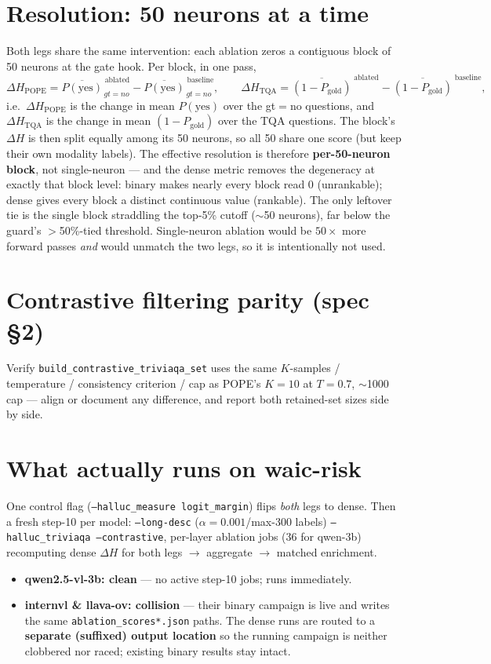 \documentclass[11pt,a4paper]{article}
\newcommand{\code}[1]{\texttt{#1}}
\begin{document}
\section{Resolution: 50 neurons at a time}
Both legs share the same intervention: each ablation zeros a contiguous block of 50
neurons at the gate hook. Per block, in one pass,
\[
\Delta H_{\text{POPE}} = \overline{P(\text{yes})}^{\;\text{ablated}}_{\,gt=no}
   - \overline{P(\text{yes})}^{\;\text{baseline}}_{\,gt=no},
\qquad
\Delta H_{\text{TQA}} = \overline{(1-P_{\text{gold}})}^{\;\text{ablated}}
   - \overline{(1-P_{\text{gold}})}^{\;\text{baseline}} ,
\]
i.e.\ $\Delta H_{\text{POPE}}$ is the change in mean $P(\text{yes})$ over the gt$=$no
questions, and $\Delta H_{\text{TQA}}$ is the change in mean $(1-P_{\text{gold}})$ over the
TQA questions. The block's $\Delta H$ is then split equally among its 50 neurons, so all 50
share one score (but keep their own modality labels). The effective resolution is therefore
\textbf{per-50-neuron block}, not single-neuron --- and the dense metric removes the
degeneracy at exactly that block level: binary makes nearly every block read $0$
(unrankable); dense gives every block a distinct continuous value (rankable). The only
leftover tie is the single block straddling the top-5\% cutoff ($\sim$50 neurons), far
below the guard's $>$50\%-tied threshold. Single-neuron ablation would be $50\times$ more
forward passes \emph{and} would unmatch the two legs, so it is intentionally not used.

\section{Contrastive filtering parity (spec \S2)}
Verify \code{build\_contrastive\_triviaqa\_set} uses the same $K$-samples / temperature /
consistency criterion / cap as POPE's $K=10$ at $T=0.7$, $\sim$1000 cap --- align or
document any difference, and report both retained-set sizes side by side.

\section{What actually runs on waic-risk}
One control flag (\code{--halluc\_measure logit\_margin}) flips \emph{both} legs to dense.
Then a fresh step-10 per model: \code{--long-desc} ($\alpha{=}0.001$/max-300 labels)
\code{--halluc\_triviaqa --contrastive}, per-layer ablation jobs (36 for qwen-3b)
recomputing dense $\Delta H$ for both legs $\to$ aggregate $\to$ matched enrichment.
\begin{itemize}[nosep]
\item \textbf{qwen2.5-vl-3b: clean} --- no active step-10 jobs; runs immediately.
\item \textbf{internvl \& llava-ov: collision} --- their binary campaign is live and writes
the same \code{ablation\_scores*.json} paths. The dense runs are routed to a
\textbf{separate (suffixed) output location} so the running campaign is neither clobbered
nor raced; existing binary results stay intact.
\end{itemize}
\end{document}
